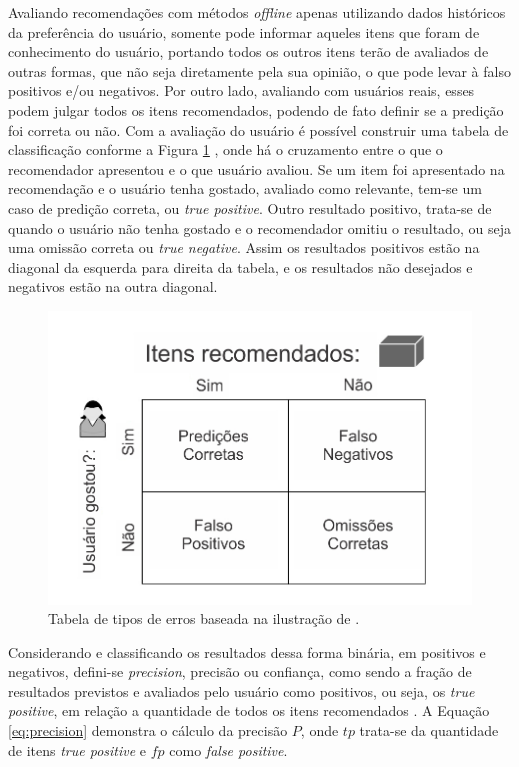 Avaliando recomendações com métodos \textit{offline} apenas utilizando dados históricos da preferência do usuário, somente pode informar aqueles itens que foram de conhecimento do usuário, portando todos os outros itens terão de avaliados de outras formas, que não seja diretamente pela sua opinião, o que pode levar à falso positivos e/ou negativos. Por outro lado, avaliando com usuários reais, esses podem julgar todos os itens recomendados, podendo de fato definir se a predição foi correta ou não. Com a avaliação do usuário é possível construir uma tabela de classificação conforme a Figura \ref{fig:truth_table} \citep{Jannach:2010}, onde há o cruzamento entre o que o recomendador apresentou e o que usuário avaliou. Se um item foi apresentado na recomendação e o usuário tenha gostado, avaliado como relevante, tem-se um caso de predição correta, ou \textit{true positive}. Outro resultado positivo, trata-se de quando o usuário não tenha gostado e o recomendador omitiu o resultado, ou seja uma omissão correta ou \textit{true negative}. Assim os resultados positivos estão na diagonal da esquerda para direita da tabela, e os resultados não desejados e negativos estão na outra diagonal. 

\begin{figure}
	\centering
	\includegraphics[scale=0.4]{imagens/truth_table.jpg}
	\caption{Tabela de tipos de erros baseada na ilustração de \cite{Jannach:2010}.}
	\label{fig:truth_table}
\end{figure}

Considerando e classificando os resultados dessa forma binária, em positivos e negativos, defini-se \textit{precision}, precisão ou confiança, como sendo a fração de resultados previstos e avaliados pelo usuário como positivos, ou seja, os \textit{true positive}, em relação a quantidade de todos os itens recomendados \citep{Powers_2008}. A Equação \ref{eq:precision} demonstra o cálculo da precisão $P$, onde $tp$ trata-se da quantidade de itens \textit{true positive} e $fp$ como \textit{false positive}.

